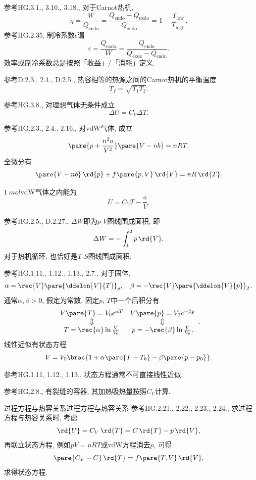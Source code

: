 \documentclass{ctexart}
\begin{document}
\begin{finale}
	参考HG.3.1., 3.10., 3.18., 对于Carnot热机,
	\[ \eta = \frac{W}{Q_{\text{endo}}} = \frac{Q_{\text{endo}} - Q_{\text{exdo}}}{Q_{\text{endo}}} = 1-\frac{T_{\text{low}}}{T_{\text{high}}}. \]
	参考HG.2.35, 制冷系数$\epsilon$谓
	\[ \epsilon = \frac{Q_{\text{endo}}}{W} = \frac{Q_{\text{endo}}}{Q_{\text{exdo}}-Q_{\text{endo}}}. \]
	效率或制冷系数总是按照「收益」/「消耗」定义.
\end{finale}
\begin{finale}
	参考D.2.3., 2.4., D.2.5., 热容相等的热源之间的Carnot热机的平衡温度
	\[ T_f = \sqrt{T_1 T_2}. \]
\end{finale}
\begin{finale}
	参考HG.3.8., 对理想气体无条件成立
	\[ \Delta U = C_V \Delta T. \]
\end{finale}
\begin{finale}
	参考HG.2.3., 2.4., 2.16., 对vdW气体, 成立
	\[ \pare{p+\frac{n^2 a}{V^2}}\pare{V-nb} = nRT. \]
	全微分有
	\[ \pare{V-nb}\,\rd{p} + f\pare{p,V}\,\rd{V} = nR\,\rd{T}. \]
\end{finale}
\begin{finale}
	$\SI{1}{mol}$vdW气体之内能为
	\[ U = C_V T - \frac{a}{V}. \]
\end{finale}
\begin{finale}
	参考HG.2.5., D.2.27., $\Delta W$即为$p$-$V$图线围成面积, 即
	\[ \Delta W = -\int_1^2 p\,\rd{V}. \]
	对于热机循环, 也恰好是$T$-$S$图线围成面积.
\end{finale}
\begin{finale}
	参考HG.1.11., 1.12., 1.13., 2.7., 对于固体,
	\[ \alpha = \rec{V}\pare{\ddelon{V}{T}}_p,\quad \beta = -\rec{V}\pare{\ddelon{V}{p}}_T. \]
	通常$\alpha, \beta>0$, 假定为常数, 固定$p$, $T$中一个后积分有
	\[ \begin{array}{cc}
		V\pare{T} = V_0 e^{\alpha T} &  V\pare{p} = V_0e^{-\beta p} \\
		\Updownarrow  & \Updownarrow \\
		T = \rec{\alpha}\ln \frac{V}{V_0} & p = -\rec{\beta}\ln \frac{V}{V_0}.
	\end{array}. \]
	线性近似有状态方程
	\[ V = V_0\brac{1+\alpha\pare{T-T_0}-\beta\pare{p-p_0}}. \]
\end{finale}
\begin{pitfall}
	参考HG.1.11, 1.12., 1.13., 状态方程通常不可直接线性近似.
\end{pitfall}
\begin{finale}
	参考HG.2.8., 有裂缝的容器, 其加热吸热量按照$C_V$计算.
\end{finale}
\begin{reflex}
	{过程方程与热容关系}{过程方程与热容关系} 参考HG.2.21., 2.22., 2.23., 2.24., 求过程方程与热容关系时, 考虑
	\[ \rd{U} = C_V\,\rd{T} = C\,\rd{T} - p\,\rd{V}, \]
	再联立状态方程, 例如$pV=nRT$或vdW方程消去$p$, 可得
	\[ \pare{C_V-C}\,\rd{T} = f\pare{T,V}\,\rd{V}, \]
	求得状态方程.
\end{reflex}
\end{document}
